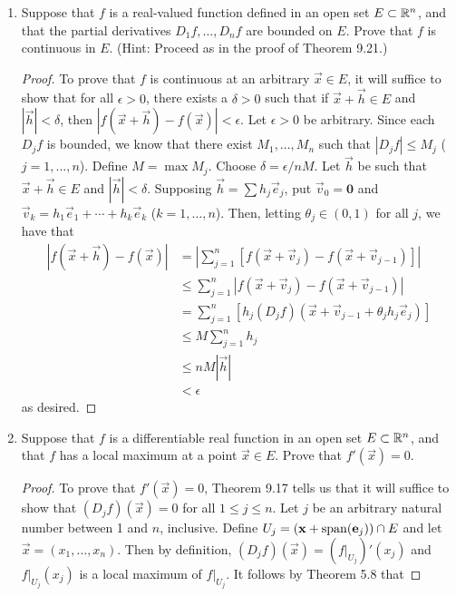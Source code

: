 \documentclass[../psets.tex]{subfiles}
\begin{document}
\begin{enumerate}[label={\textbf{\arabic*.}}]
\begin{proof}
\begin{equation*}
            f(t,t) = \frac{t^2}{t^2+t^2} = \frac{1}{2}
        \end{equation*}
        for all $t$ (notably arbitrarily small $t$), we find points $(x,y)\in\R^2$ arbitrarily close to $(0,0)$ for which $f(x,y)=1/2$. Therefore, $f$ is not continuous at $(0,0)$.
    \end{proof}
    \item Suppose that $f$ is a real-valued function defined in an open set $E\subset\mathbb{R}^n$, and that the partial derivatives $D_1f,\dots,D_nf$ are bounded on $E$. Prove that $f$ is continuous in $E$. (Hint: Proceed as in the proof of Theorem 9.21.)
    \begin{proof}
        To prove that $f$ is continuous at an arbitrary $\vec{x}\in E$, it will suffice to show that for all $\epsilon>0$, there exists a $\delta>0$ such that if $\vec{x}+\vec{h}\in E$ and $|\vec{h}|<\delta$, then $|f(\vec{x}+\vec{h})-f(\vec{x})|<\epsilon$. Let $\epsilon>0$ be arbitrary. Since each $D_jf$ is bounded, we know that there exist $M_1,\dots,M_n$ such that $|D_jf|\leq M_j$ ($j=1,\dots,n$). Define $M=\max M_j$. Choose $\delta=\epsilon/nM$. Let $\vec{h}$ be such that $\vec{x}+\vec{h}\in E$ and $|\vec{h}|<\delta$. Supposing $\vec{h}=\sum h_j\vec{e}_j$, put $\vec{v}_0=\bm{0}$ and $\vec{v}_k=h_1\vec{e}_1+\cdots+h_k\vec{e}_k$ ($k=1,\dots,n$). Then, letting $\theta_j\in(0,1)$ for all $j$, we have that
        \begin{align*}
            |f(\vec{x}+\vec{h})-f(\vec{x})| &= \left| \sum_{j=1}^n[f(\vec{x}+\vec{v}_j)-f(\vec{x}+\vec{v}_{j-1})] \right|\\
            &\leq \sum_{j=1}^n|f(\vec{x}+\vec{v}_j)-f(\vec{x}+\vec{v}_{j-1})|\\
            &= \sum_{j=1}^n[h_j(D_jf)(\vec{x}+\vec{v}_{j-1}+\theta_jh_j\vec{e}_j)]\tag*{MVT}\\
            &\leq M\sum_{j=1}^nh_j\\
            &\leq nM|\vec{h}|\\
            &< \epsilon
        \end{align*}
        as desired.
    \end{proof}
    \item Suppose that $f$ is a differentiable real function in an open set $E\subset\mathbb{R}^n$, and that $f$ has a local maximum at a point $\vec{x}\in E$. Prove that $f'(\vec{x})=0$.
    \begin{proof}
        To prove that $f'(\vec{x})=0$, Theorem 9.17 tells us that it will suffice to show that $(D_jf)(\vec{x})=0$ for all $1\leq j\leq n$. Let $j$ be an arbitrary natural number between 1 and $n$, inclusive. Define $U_j=(\mathbf{x}+\operatorname{span}(\mathbf{e}_j))\cap E$ and let $\vec{x}=(x_1,\dots,x_n)$. Then by definition, $(D_jf)(\vec{x})=(f|_{U_j})'(x_j)$ and $f|_{U_j}(x_j)$ is a local maximum of $f|_{U_j}$. It follows by Theorem 5.8 that

\end{proof}
\end{enumerate}
\end{document}

